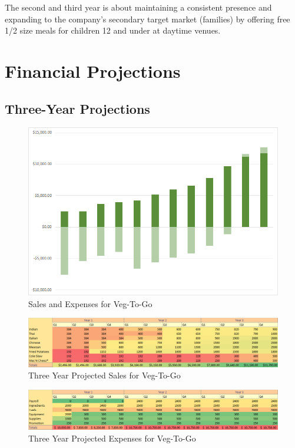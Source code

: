 \documentclass[12pt, letterpaper]{article}
\newcommand{\companyname}{Veg-To-Go}
\begin{document}
The second and third year is about maintaining a consistent presence and expanding to the company's secondary target market (families) by offering free 1/2 size meals for children 12 and under at daytime venues.

\section{Financial Projections}
\subsection{Three-Year Projections}

\begin{figure}[H]
	\caption{Sales and Expenses for \companyname{}}
	\includegraphics[width=\textwidth]{SalesAndExpenses}
\end{figure}

\begin{figure}[H]
	\label{products}
	\caption{Three Year Projected Sales for \companyname{}}
	\includegraphics[width=\textwidth]{SalesNumbers}
\end{figure}

\begin{figure}[H]
	\caption{Three Year Projected Expenses for \companyname{}}
	\includegraphics[width=\textwidth]{ExpensesNumbers}
\end{figure}
\end{document}
